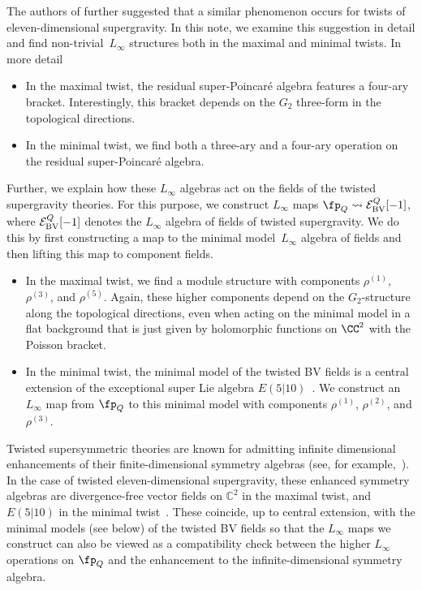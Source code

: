 \documentclass[10pt,a4paper]{amsart}
\numberwithin{equation}{section}
\theoremstyle{definition}
\def\cE{\mathcal E}\def\cF{\mathcal F}\def\cG{\mathcal G}\def\cH{\mathcal H}
\def\C{\mathbb{C}}
\begin{document}
The authors of \cite{JKY} further suggested that a similar phenomenon occurs for twists of eleven-dimensional supergravity. In this note, we examine this suggestion in detail and find non-trivial~$L_\infty$ structures both in the maximal and minimal twists. In more detail
\begin{itemize}\itemsep=0pt
 \item[--] In the maximal twist, the residual super-Poincar\'e algebra features a four-ary bracket. Interestingly, this bracket depends on the $G_2$ three-form in the topological directions.
 \item[--] In the minimal twist, we find both a three-ary and a four-ary operation on the residual super-Poincar\'e algebra.
\end{itemize}
Further, we explain how these $L_\infty$ algebras act on the fields of the twisted supergravity theories. For this purpose, we construct $L_\infty$ maps $\fp_Q \rightsquigarrow \cE^{Q}_{\rm BV}[-1]$, where $ \cE^{Q}_{\rm BV}[-1]$ denotes the $L_\infty$ algebra of fields of twisted supergravity. We do this by first constructing a map to the minimal model~$L_\infty$ algebra of fields and then lifting this map to component fields.
\begin{itemize}\itemsep=0pt
 \item[--] In the maximal twist, we find a module structure with components $\rho^{(1)}$, $\rho^{(3)}$, and $\rho^{(5)}$. Again, these higher components depend on the $G_2$-structure along the topological directions, even when acting on the minimal model in a flat background that is just given by holomorphic functions on $\CC^2$ with the Poisson bracket.
 \item[--] In the minimal twist, the minimal model of the twisted BV fields is a central extension of the exceptional super Lie algebra $E(5|10)$~\cite{RSW}. We construct an $L_\infty$ map from $\fp_Q$ to this minimal model with components $\rho^{(1)}$, $\rho^{(2)}$, and $\rho^{(3)}$.
\end{itemize}
Twisted supersymmetric theories are known for admitting infinite dimensional enhancements of their finite-dimensional symmetry algebras (see, for example,~\cite{Beem:2013sza, Garner:2023wrc, SCA}). In the case of twisted eleven-dimensional supergravity, these enhanced symmetry algebras are divergence-free vector fields on $\C^2$ in the maximal twist, and $E(5|10)$ in the minimal twist~\cite{LSCA, RSW}. These coincide, up to central extension, with the minimal models (see below) of the twisted BV fields so that the $L_\infty$ maps we construct can also be viewed as a compatibility check between the higher $L_\infty$ operations on $\fp_Q$ and the enhancement to the infinite-dimensional symmetry algebra.
\end{document}
